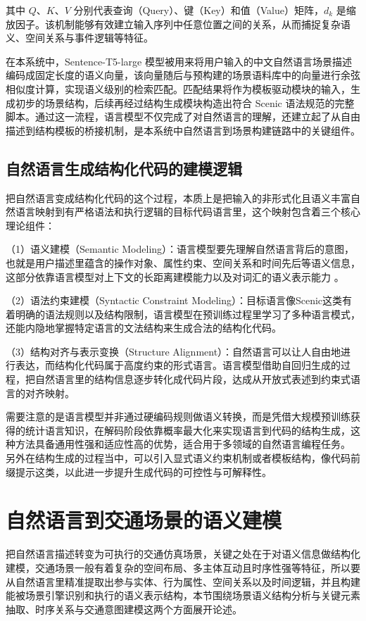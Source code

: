 其中 $Q$、$K$、$V$ 分别代表查询（Query）、键（Key）和值（Value）矩阵，$d_k$ 是缩放因子。该机制能够有效建立输入序列中任意位置之间的关系，从而捕捉复杂语义、空间关系与事件逻辑等特征。

在本系统中，Sentence-T5-large 模型被用来将用户输入的中文自然语言场景描述编码成固定长度的语义向量，该向量随后与预构建的场景语料库中的向量进行余弦相似度计算，实现语义级别的检索匹配。匹配结果将作为模板驱动模块的输入，生成初步的场景结构，后续再经过结构生成模块构造出符合 Scenic 语法规范的完整脚本。通过这一流程，语言模型不仅完成了对自然语言的理解，还建立起了从自由描述到结构模板的桥接机制，是本系统中自然语言到场景构建链路中的关键组件。


\subsection{自然语言生成结构化代码的建模逻辑}

把自然语言变成结构化代码的这个过程，本质上是把输入的非形式化且语义丰富自然语言映射到有严格语法和执行逻辑的目标代码语言里，这个映射包含着三个核心理论组件：


（1）语义建模（Semantic Modeling）：语言模型要先理解自然语言背后的意图，也就是用户描述里蕴含的操作对象、属性约束、空间关系和时间先后等语义信息，这部分依靠语言模型对上下文的长距离建模能力以及对词汇的语义表示能力 。

（2）语法约束建模（Syntactic Constraint Modeling）：目标语言像Scenic这类有着明确的语法规则以及结构限制，语言模型在预训练过程里学习了多种语言模式，还能内隐地掌握特定语言的文法结构来生成合法的结构化代码。

（3）结构对齐与表示变换（Structure Alignment）：自然语言可以让人自由地进行表达，而结构化代码属于高度约束的形式语言。语言模型借助自回归生成的过程，把自然语言里的结构信息逐步转化成代码片段，达成从开放式表述到约束式语言的对齐映射。


需要注意的是语言模型并非通过硬编码规则做语义转换，而是凭借大规模预训练获得的统计语言知识，在解码阶段依靠概率最大化来实现语言到代码的结构生成，这种方法具备通用性强和适应性高的优势，适合用于多领域的自然语言编程任务。
另外在结构生成的过程当中，可以引入显式语义约束机制或者模板结构，像代码前缀提示这类，以此进一步提升生成代码的可控性与可解释性。
\section{自然语言到交通场景的语义建模}

把自然语言描述转变为可执行的交通仿真场景，关键之处在于对语义信息做结构化建模，交通场景一般有着复杂的空间布局、多主体互动且时序性强等特征，所以要从自然语言里精准提取出参与实体、行为属性、空间关系以及时间逻辑，并且构建能被场景引擎识别和执行的语义表示结构，本节围绕场景语义结构分析与关键元素抽取、时序关系与交通意图建模这两个方面展开论述。


